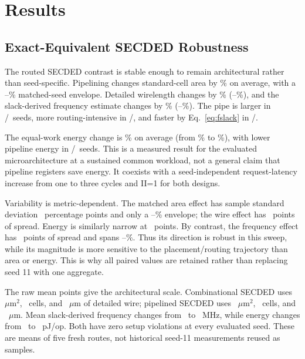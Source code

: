 \section{Results}



\subsection{Exact-Equivalent SECDED Robustness}

The routed SECDED contrast is stable enough to remain architectural rather than seed-specific. Pipelining changes standard-cell area by \SecAreaEffectMean\% on average, with a \SecAreaEffectMin--\SecAreaEffectMax\% matched-seed envelope. Detailed wirelength changes by \SecWireEffectMean\% (\SecWireEffectMin--\SecWireEffectMax\%), and the slack-derived frequency estimate changes by \SecFreqEffectMean\% (\SecFreqEffectMin--\SecFreqEffectMax\%). The pipe is larger in \AreaOrderingCount/\SeedCount\ seeds, more routing-intensive in \WireOrderingCount/\SeedCount, and faster by Eq.~\eqref{eq:fslack} in \FreqOrderingCount/\SeedCount.

The equal-work energy change is \SecEnergyEffectMean\% on average (from \SecEnergyEffectMin\% to \SecEnergyEffectMax\%), with lower pipeline energy in \EnergyOrderingCount/\SeedCount\ seeds. This is a measured result for the evaluated microarchitecture at a sustained common workload, not a general claim that pipeline registers save energy. It coexists with a seed-independent request-latency increase from one to three cycles and II=1 for both designs.

Variability is metric-dependent. The matched area effect has sample standard deviation \SecAreaEffectStd\ percentage points and only a \SecAreaEffectMin--\SecAreaEffectMax\% envelope; the wire effect has \SecWireEffectStd\ points of spread. Energy is similarly narrow at \SecEnergyEffectStd\ points. By contrast, the frequency effect has \SecFreqEffectStd\ points of spread and spans \SecFreqEffectMin--\SecFreqEffectMax\%. Thus its direction is robust in this sweep, while its magnitude is more sensitive to the placement/routing trajectory than area or energy. This is why all paired values are retained rather than replacing seed 11 with one aggregate.

The raw mean points give the architectural scale. Combinational SECDED uses \CombAreaMean~$\mu$m$^2$, \CombCellsMean\ cells, and \CombWireMean~$\mu$m of detailed wire; pipelined SECDED uses \PipeAreaMean~$\mu$m$^2$, \PipeCellsMean\ cells, and \PipeWireMean~$\mu$m. Mean slack-derived frequency changes from \CombFreqMean\ to \PipeFreqMean~MHz, while energy changes from \CombEnergyMean\ to \PipeEnergyMean~pJ/op. Both have zero setup violations at every evaluated seed. These are means of five fresh routes, not historical seed-11 measurements reused as samples.


